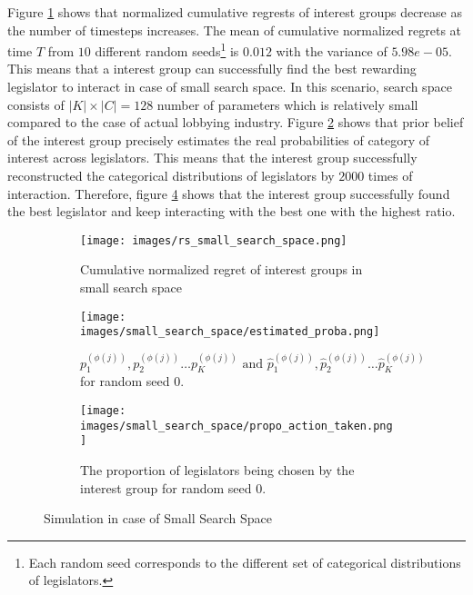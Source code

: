 \documentclass{article}
\begin{document}
Figure \ref{fig:rs_small} shows that 
normalized cumulative regrests of interest groups 
decrease as the number of timesteps increases.
The mean of cumulative normalized regrets at time $T$ from 
$10$ different random seeds\footnote{Each random seed  
corresponds to the different set of categorical distributions of legislators. 
} is $0.012$ with 
the variance of $5.98e-05$. 
This means that 
a interest group can successfully find the 
best rewarding legislator to interact in case of small search space.
In this scenario, search space consists of 
$|K| \times |C| = 128$ number of parameters 
which is relatively small compared to the case of 
actual lobbying industry.
Figure \ref{fig:smallproba} shows that 
prior belief of the interest group precisely 
estimates the real probabilities of category of interest across legislators. 
This means that the interest group successfully
reconstructed the categorical distributions of legislators by $2000$ times of interaction.
Therefore, figure \ref{fig:smallpropo} shows that the interest group 
successfully found the best legislator and keep interacting 
with the best one with the highest ratio.

\begin{figure}[h!]  
    \centering %
    \begin{subfigure}[b]{0.45\textwidth}
        \texttt{[image: images/rs\_small\_search\_space.png]}
        \caption{Cumulative normalized regret of interest groups in small search space}
        \label{fig:rs_small}
    \end{subfigure}
    \begin{subfigure}[b]{0.5\textwidth}
        \texttt{[image: images/small\_search\_space/estimated\_proba.png]}
        \caption{$p_1^{(\phi(j))}, p_2^{(\phi(j))} \hdots p_K^{(\phi(j))} \text{ and } \hat{p}_1^{(\phi(j))}, \hat{p}_2^{(\phi(j))} \hdots \hat{p}_K^{(\phi(j))}$ for random seed $0$.}
        \label{fig:smallproba}
    \end{subfigure}

    \begin{subfigure}[b]{1\columnwidth}
        \centering
        \texttt{[image: images/small\_search\_space/propo\_action\_taken.png]}
        \caption{The proportion of legislators being chosen by the interest group for random seed $0$.}
        \label{fig:smallpropo}
    \end{subfigure}
    \caption{Simulation in case of Small Search Space}
\end{figure}
    
\end{document}
